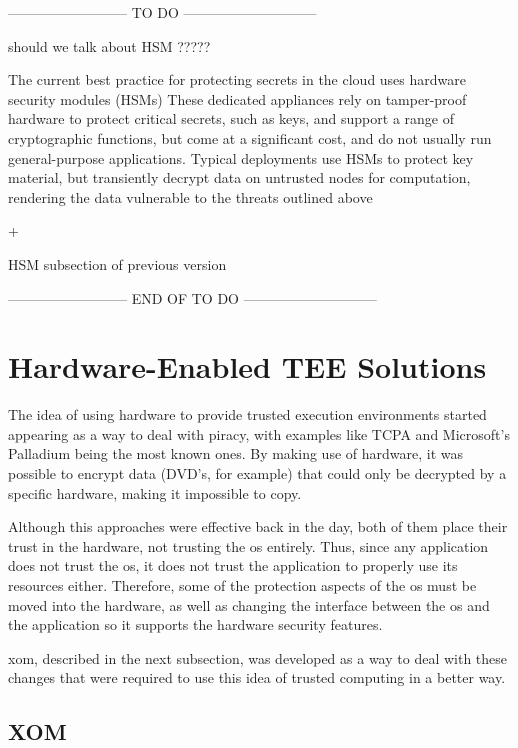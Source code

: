 -------------------------- TO DO -----------------------------

 			should we talk about HSM ?????
 			
 			The current best practice for protecting secrets in the
 			cloud uses hardware security modules (HSMs)
 			These dedicated appliances rely on tamper-proof hardware to protect critical secrets, such as keys, and support
 			a range of cryptographic functions, but come at a significant cost, and do not usually run general-purpose applications.
 			Typical deployments use HSMs to protect key
 			material, but transiently decrypt data on untrusted nodes
 			for computation, rendering the data vulnerable to the
 			threats outlined above 
 			
 			+ 
 			
 			HSM subsection of previous version

-------------------------- END OF TO DO -----------------------------



\section{Hardware-Enabled TEE Solutions}


The idea of using hardware to provide trusted execution environments started appearing as a way to deal with piracy, with examples like TCPA \cite{tcpaPaper} and Microsoft's Palladium being the most known ones. By making use of hardware, it was possible to encrypt data (DVD's, for example) that could only be decrypted by a specific hardware, making it impossible to copy. 

Although this approaches were effective back in the day, both of them place their trust in the hardware, not trusting the \gls{os} entirely. 
Thus, since any application does not trust the \gls{os}, it does not trust the application to properly use its resources either. Therefore, some of the protection aspects of the \gls{os} must be moved into the hardware, as well as changing the interface between the \gls{os} and the application so it supports the hardware security features. 

\gls{xom}, described in the next subsection, was developed as a way to deal with these changes that were required to use this idea of trusted computing in a better way.

\subsection{XOM}

